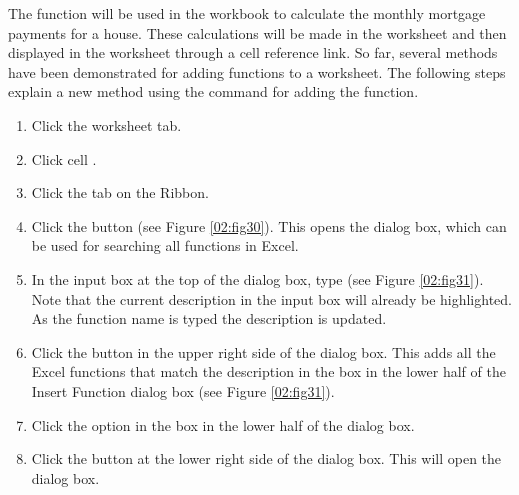 The  function will be used in the  workbook to calculate the monthly mortgage payments for a house. These calculations will be made in the  worksheet and then displayed in the  worksheet through a cell reference link. So far, several methods have been demonstrated for adding functions to a worksheet. The following steps explain a new method using the  command for adding the  function.

\begin{enumerate}
	\item Click the  worksheet tab.
	\item Click cell .
	\item Click the  tab on the Ribbon.
	\item Click the  button (see Figure \ref{02:fig30}). This opens the  dialog box, which can be used for searching all functions in Excel.
	\item In the  input box at the top of the  dialog box, type  (see Figure \ref{02:fig31}). Note that the current description in the  input box will already be highlighted. As the function name is typed the description is updated.
	\item Click the  button in the upper right side of the  dialog box. This adds all the Excel functions that match the description in the  box in the lower half of the Insert Function dialog box (see Figure \ref{02:fig31}).
	\item Click the  option in the  box in the lower half of the  dialog box.
	\item Click the  button at the lower right side of the  dialog box. This will open the  dialog box.
\end{enumerate}

